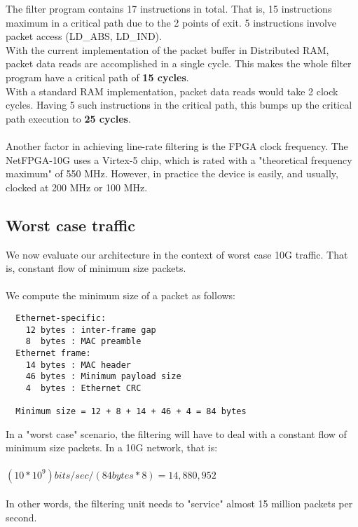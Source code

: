 \documentclass{l4proj}
\begin{document}
The filter program contains 17 instructions in total. That is, 15 instructions maximum in a critical path due to the 2 points of exit. 5 instructions involve packet access (LD\_ABS, LD\_IND).\\
With the current implementation of the packet buffer in Distributed RAM, packet data reads are accomplished in a single cycle. This makes the whole filter program have a critical path of \textbf{15 cycles}.\\
With a standard RAM implementation, packet data reads would take 2 clock cycles. Having 5 such instructions in the critical path, this bumps up the critical path execution to \textbf{25 cycles}.\\\\
Another factor in achieving line-rate filtering is the FPGA clock frequency. The NetFPGA-10G uses a Virtex-5 chip, which is rated with a "theoretical frequency maximum" of 550 MHz. However, in practice the device is easily, and usually, clocked at 200 MHz or 100 MHz.

\subsection{Worst case traffic}
We now evaluate our architecture in the context of worst case 10G traffic. That is, constant flow of minimum size packets.\\\\
We compute the minimum size of a packet as follows:
\begin{lstlisting}
  Ethernet-specific:
    12 bytes : inter-frame gap
    8  bytes : MAC preamble
  Ethernet frame:
    14 bytes : MAC header
    46 bytes : Minimum payload size
    4  bytes : Ethernet CRC
    
  Minimum size = 12 + 8 + 14 + 46 + 4 = 84 bytes
\end{lstlisting}
In a "worst case" scenario, the filtering will have to deal with a constant flow of minimum size packets. In a 10G network, that is:\\\\
\large{\((10 * 10^9) bits/sec / (84 bytes * 8) = 14,880,952\)}\\\\
In other words, the filtering unit needs to "service" almost 15 million packets per second.
\end{document}
